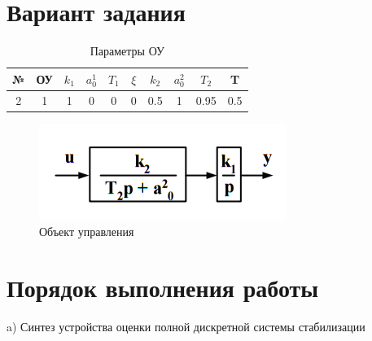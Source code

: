 \documentclass[a4paper,14pt]{extreport}
\begin{document}
	\section{Вариант задания}
		\begin{table}[H]
		\centering
		\caption{Параметры ОУ}
		\label{my-label}
		\begin{tabular}{|c|c|c|c|c|c|c|c|c|c|}
			\hline
			№ & ОУ & $k_1$ & $a_0^1$ & $T_1$ & $\xi$ & $k_2$ & $a_0^2$ & $T_2$ & T   \\ \hline
			2 & 1  & 1     & 0       & 0     & 0     & 0.5   & 1       & 0.95  & 0.5 \\ \hline
		\end{tabular}
	\end{table}
	
	\begin{figure}[H]
		\center\includegraphics[width=0.5\linewidth]{oc.png}
		\caption{Объект управления}
		\label{fig:scr1}
	\end{figure}

	\section{Порядок выполнения работы}
	a) Синтез устройства оценки полной дискретной системы стабилизации
	
\end{document}
